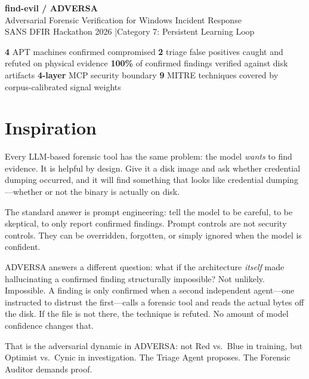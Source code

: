\documentclass[10pt, letterpaper]{article}
\begin{document}
\begin{center}
  {\LARGE\bfseries\color{accent} find-evil / ADVERSA}\\[3pt]
  {\large Adversarial Forensic Verification for Windows Incident Response}\\[2pt]
  {\small SANS DFIR Hackathon 2026 \quad|\quad Category 7: Persistent Learning Loop}
\end{center}

\begin{statbox}
\small\centering
\textbf{4} APT machines confirmed compromised\quad
\textbf{2} triage false positives caught and refuted on physical evidence\quad
\textbf{100\%} of confirmed findings verified against disk artifacts\quad
\textbf{4-layer} MCP security boundary\quad
\textbf{9} MITRE techniques covered by corpus-calibrated signal weights
\end{statbox}

\section{Inspiration}

Every LLM-based forensic tool has the same problem: the model
\emph{wants} to find evidence. It is helpful by design. Give it a
disk image and ask whether credential dumping occurred, and it will
find something that looks like credential dumping---whether or not the
binary is actually on disk.

The standard answer is prompt engineering: tell the model to be
careful, to be skeptical, to only report confirmed findings. Prompt
controls are not security controls. They can be overridden, forgotten,
or simply ignored when the model is confident.

ADVERSA answers a different question: what if the architecture
\emph{itself} made hallucinating a confirmed finding structurally
impossible? Not unlikely. Impossible. A finding is only confirmed when a
second independent agent---one instructed to distrust the first---calls
a forensic tool and reads the actual bytes off the disk. If the file is
not there, the technique is refuted. No amount of model confidence
changes that.

That is the adversarial dynamic in ADVERSA: not Red vs.\ Blue in
training, but Optimist vs.\ Cynic in investigation. The Triage Agent
proposes. The Forensic Auditor demands proof.
\end{document}
